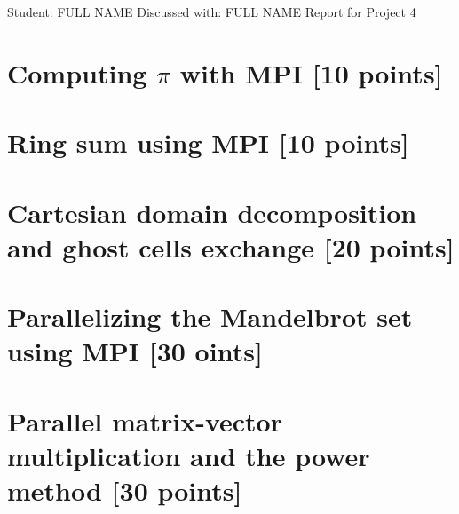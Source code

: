 \documentclass[unicode,10pt,a4paper,oneside,numbers=endperiod,openany]{scrartcl}
\begin{document}
\setassignment
{}

            {Student: FULL NAME}
            {Discussed with: FULL NAME}
            {Report for Project 4}{}
\newline

\assignmentpolicy

\section{Computing $\pi$ with MPI [10 points]}

\section{Ring sum using MPI [10 points]}

\section{Cartesian domain decomposition and ghost cells exchange [20 points]}

\section{Parallelizing the Mandelbrot set using MPI [30 oints]}

\section{Parallel matrix-vector multiplication and the power method
         [30 points]}
\end{document}
